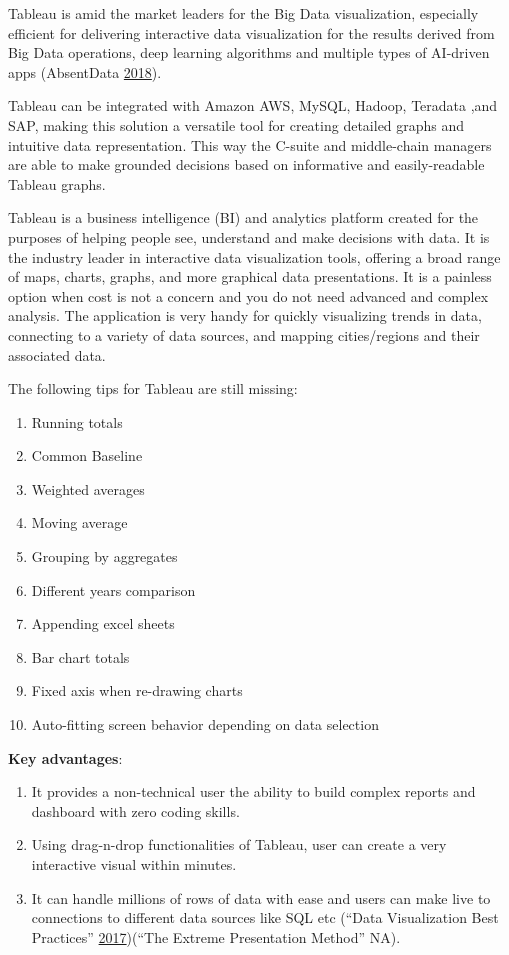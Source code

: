 \documentclass[]{book}
\providecommand{\tightlist}{%
  \setlength{\itemsep}{0pt}\setlength{\parskip}{0pt}}
\begin{document}
Tableau is amid the market leaders for the Big Data visualization,
especially efficient for delivering interactive data visualization for
the results derived from Big Data operations, deep learning algorithms
and multiple types of AI-driven apps (AbsentData
\protect\hyperlink{ref-tableau_interactive_viz}{2018}).

Tableau can be integrated with Amazon AWS, MySQL, Hadoop, Teradata ,and
SAP, making this solution a versatile tool for creating detailed graphs
and intuitive data representation. This way the C-suite and middle-chain
managers are able to make grounded decisions based on informative and
easily-readable Tableau graphs.

Tableau is a business intelligence (BI) and analytics platform created
for the purposes of helping people see, understand and make decisions
with data. It is the industry leader in interactive data visualization
tools, offering a broad range of maps, charts, graphs, and more
graphical data presentations. It is a painless option when cost is not a
concern and you do not need advanced and complex analysis. The
application is very handy for quickly visualizing trends in data,
connecting to a variety of data sources, and mapping cities/regions and
their associated data.

The following tips for Tableau are still missing:

\begin{enumerate}
\def\labelenumi{\arabic{enumi}.}
\tightlist
\item
  Running totals
\item
  Common Baseline
\item
  Weighted averages
\item
  Moving average
\item
  Grouping by aggregates
\item
  Different years comparison
\item
  Appending excel sheets
\item
  Bar chart totals
\item
  Fixed axis when re-drawing charts
\item
  Auto-fitting screen behavior depending on data selection
\end{enumerate}

\textbf{Key advantages}:

\begin{enumerate}
\def\labelenumi{\arabic{enumi}.}
\tightlist
\item
  It provides a non-technical user the ability to build complex reports
  and dashboard with zero coding skills.
\item
  Using drag-n-drop functionalities of Tableau, user can create a very
  interactive visual within minutes.
\item
  It can handle millions of rows of data with ease and users can make
  live to connections to different data sources like SQL etc (``Data
  Visualization Best Practices''
  \protect\hyperlink{ref-VizBP}{2017})(``The Extreme Presentation
  Method'' NA).
\end{enumerate}
\end{document}
